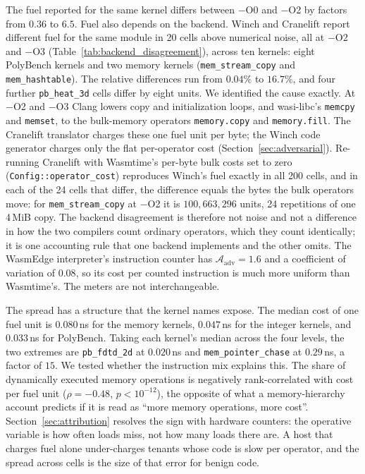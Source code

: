 \documentclass{ws-jcsc}
\begin{document}
The fuel reported for the same kernel differs between $-$O0 and $-$O2 by factors from $0.36$ to $6.5$. Fuel also depends on the backend. Winch and Cranelift report different fuel for the same module in 20 cells above numerical noise, all at $-$O2 and $-$O3 (Table~\ref{tab:backend_disagreement}), across ten kernels: eight PolyBench kernels and two memory kernels (\texttt{mem\_stream\_copy} and \texttt{mem\_hashtable}). The relative differences run from $0.04\%$ to $16.7\%$, and four further \texttt{pb\_heat\_3d} cells differ by eight units. We identified the cause exactly. At $-$O2 and $-$O3 Clang lowers copy and initialization loops, and wasi-libc's \texttt{memcpy} and \texttt{memset}, to the bulk-memory operators \texttt{memory.copy} and \texttt{memory.fill}. The Cranelift translator charges these one fuel unit per byte; the Winch code generator charges only the flat per-operator cost (Section~\ref{sec:adversarial}). Re-running Cranelift with Wasmtime's per-byte bulk costs set to zero (\texttt{Config::operator\_cost}) reproduces Winch's fuel exactly in all 200 cells, and in each of the 24 cells that differ, the difference equals the bytes the bulk operators move: for \texttt{mem\_stream\_copy} at $-$O2 it is $100{,}663{,}296$ units, 24 repetitions of one 4\,MiB copy. The backend disagreement is therefore not noise and not a difference in how the two compilers count ordinary operators, which they count identically; it is one accounting rule that one backend implements and the other omits. The WasmEdge interpreter's instruction counter has $\mathcal{A}_{\mathrm{adv}}=1.6$ and a coefficient of variation of $0.08$, so its cost per counted instruction is much more uniform than Wasmtime's. The meters are not interchangeable.



The spread has a structure that the kernel names expose. The median cost of one fuel unit is $0.080$\,ns for the memory kernels, $0.047$\,ns for the integer kernels, and $0.033$\,ns for PolyBench. Taking each kernel's median across the four levels, the two extremes are \texttt{pb\_fdtd\_2d} at $0.020$\,ns and \texttt{mem\_pointer\_chase} at $0.29$\,ns, a factor of $15$. We tested whether the instruction mix explains this. The share of dynamically executed memory operations is negatively rank-correlated with cost per fuel unit ($\rho=-0.48$, $p<10^{-12}$), the opposite of what a memory-hierarchy account predicts if it is read as ``more memory operations, more cost''. Section~\ref{sec:attribution} resolves the sign with hardware counters: the operative variable is how often loads miss, not how many loads there are. A host that charges fuel alone under-charges tenants whose code is slow per operator, and the spread across cells is the size of that error for benign code.
\end{document}
